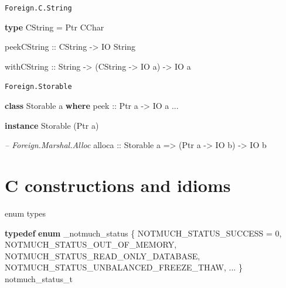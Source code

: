 \documentclass[ignorenonframetext,aspectratio=169]{beamer}
\newenvironment{Shaded}{}{}
\newcommand{\KeywordTok}[1]{\textcolor[rgb]{0.00,0.44,0.13}{\textbf{{#1}}}}
\newcommand{\DataTypeTok}[1]{\textcolor[rgb]{0.56,0.13,0.00}{{#1}}}
\newcommand{\DecValTok}[1]{\textcolor[rgb]{0.25,0.63,0.44}{{#1}}}
\newcommand{\CommentTok}[1]{\textcolor[rgb]{0.38,0.63,0.69}{\textit{{#1}}}}
\newcommand{\OtherTok}[1]{\textcolor[rgb]{0.00,0.44,0.13}{{#1}}}
\newcommand{\FunctionTok}[1]{\textcolor[rgb]{0.02,0.16,0.49}{{#1}}}
\newcommand{\NormalTok}[1]{{#1}}
\begin{document}
\begin{frame}[fragile]{\texttt{Foreign.C.String}}

\begin{Shaded}
\begin{Highlighting}[]
\KeywordTok{type} \DataTypeTok{CString} \FunctionTok{=} \DataTypeTok{Ptr} \DataTypeTok{CChar}

\OtherTok{peekCString ::} \DataTypeTok{CString} \OtherTok{->} \DataTypeTok{IO} \DataTypeTok{String}

\OtherTok{withCString ::} \DataTypeTok{String} \OtherTok{->} \NormalTok{(}\DataTypeTok{CString} \OtherTok{->} \DataTypeTok{IO} \NormalTok{a) }\OtherTok{->} \DataTypeTok{IO} \NormalTok{a}
\end{Highlighting}
\end{Shaded}

\end{frame}

\begin{frame}[fragile]{\texttt{Foreign.Storable}}

\begin{Shaded}
\begin{Highlighting}[]
\KeywordTok{class} \DataTypeTok{Storable} \NormalTok{a }\KeywordTok{where}
\OtherTok{  peek ::} \DataTypeTok{Ptr} \NormalTok{a }\OtherTok{->} \DataTypeTok{IO} \NormalTok{a}
  \OtherTok{...}

\KeywordTok{instance} \DataTypeTok{Storable} \NormalTok{(}\DataTypeTok{Ptr} \NormalTok{a)}


\CommentTok{-- Foreign.Marshal.Alloc}
\OtherTok{alloca ::} \DataTypeTok{Storable} \NormalTok{a }\OtherTok{=>} \NormalTok{(}\DataTypeTok{Ptr} \NormalTok{a }\OtherTok{->} \DataTypeTok{IO} \NormalTok{b) }\OtherTok{->} \DataTypeTok{IO} \NormalTok{b}
\end{Highlighting}
\end{Shaded}

\end{frame}

\section{C constructions and idioms}\label{c-constructions-and-idioms}

\begin{frame}[fragile]{enum types}

\begin{Shaded}
\begin{Highlighting}[]
\KeywordTok{typedef} \KeywordTok{enum} \NormalTok{_notmuch_status \{}
  \NormalTok{NOTMUCH_STATUS_SUCCESS = }\DecValTok{0}\NormalTok{,}
  \NormalTok{NOTMUCH_STATUS_OUT_OF_MEMORY,}
  \NormalTok{NOTMUCH_STATUS_READ_ONLY_DATABASE,}
  \NormalTok{NOTMUCH_STATUS_UNBALANCED_FREEZE_THAW,}
  \NormalTok{...}
\NormalTok{\} notmuch_status_t}
\end{Highlighting}
\end{Shaded}

\end{frame}
\end{document}
